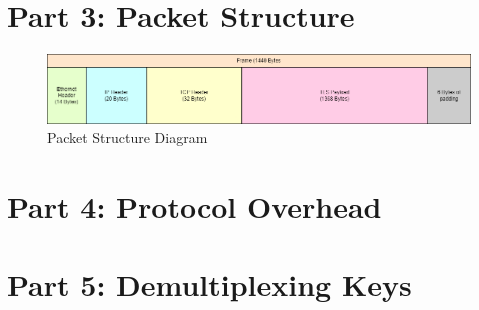 \documentclass{article}
\begin{document}
    \section*{Part 3: Packet Structure}
    \begin{figure}[htbp]
        \centering
        \includegraphics[width=\textwidth]{images/packet_structure.drawio.png}
        \caption{Packet Structure Diagram}
    \end{figure}
    \section*{Part 4: Protocol Overhead}

    \section*{Part 5: Demultiplexing Keys}
\end{document}
